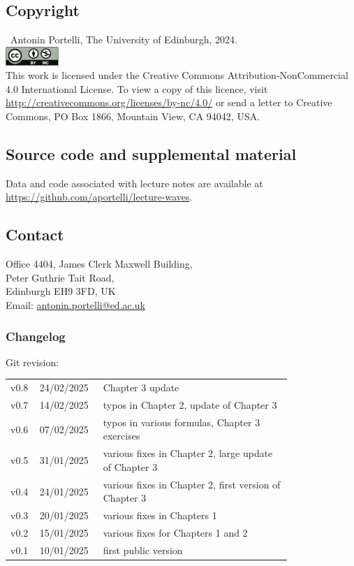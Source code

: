 \documentclass[a4paper,12pt]{book}
\theoremstyle{plain}
\theoremstyle{plain}
\theoremstyle{plain}
\theoremstyle{plain}
\theoremstyle{definition}
\theoremstyle{definition}
\begin{document}
{ \footnotesize %
  \subsection*{Copyright}
  \textcopyright~Antonin Portelli, The University of Edinburgh, 2024.
  \vspace*{10pt}\\
  \noindent\includegraphics[width=2cm]{by-nc.pdf}\\
  This work is licensed under the Creative Commons
  Attribution-NonCommercial 4.0 International
  License. To view a copy of this licence, visit
  \url{http://creativecommons.org/licenses/by-nc/4.0/} or send a
  letter to Creative Commons, PO
  Box 1866, Mountain View, CA 94042, USA.

  \subsection*{Source code and supplemental material}
  Data and code associated with lecture notes are available at
  \url{https://github.com/aportelli/lecture-waves}.

  \subsection*{Contact}
  Office 4404, James Clerk Maxwell Building,\\
  Peter Guthrie Tait Road,\\
  Edinburgh EH9 3FD, UK\\
  Email: \href{mailto:antonin.portelli@ed.ac.uk}{antonin.portelli@ed.ac.uk}

  \vfill
  \subsubsection*{Changelog}
  \scriptsize
  Git revision: \gitDescribe\vspace*{0.2cm}\\
  \begin{tabular}{@{} L{0.05\linewidth} L{0.15\linewidth} L{0.6\linewidth} @{}}
    \toprule
    v0.8 & 24/02/2025 & Chapter 3 update \\
    v0.7 & 14/02/2025 & typos in Chapter 2, update of Chapter 3\\
    v0.6 & 07/02/2025 & typos in various formulas, Chapter 3 exercises \\
    v0.5 & 31/01/2025 & various fixes in Chapter 2, large update of Chapter 3\\
    v0.4 & 24/01/2025 & various fixes in Chapter 2, first version of Chapter 3\\
    v0.3 & 20/01/2025 & various fixes in Chapters 1\\
    v0.2 & 15/01/2025 & various fixes for Chapters 1 and 2\\
    v0.1 & 10/01/2025 & first public version\\
    \bottomrule
  \end{tabular}
}
\end{document}
